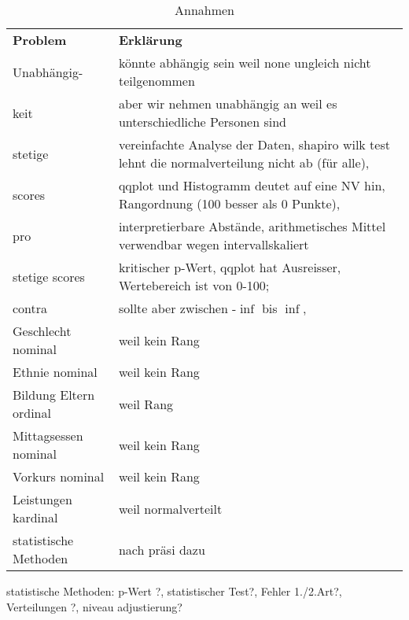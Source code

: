 \documentclass[11pt,a4paper]{article}
\author{Tim Ritter}
\begin{document}
\begin{table}[h!]
\caption{Annahmen}\bigskip
\centering
\begin{tabular}{l|l}
\textbf{Problem} & \textbf{Erklärung} \\
Unabhängig- & könnte abhängig sein weil none ungleich nicht teilgenommen \\
keit  & aber wir nehmen unabhängig an weil es unterschiedliche Personen sind\\
stetige &  vereinfachte Analyse der Daten, shapiro wilk test lehnt die normalverteilung nicht ab (für alle),\\
scores & qqplot und Histogramm deutet auf eine NV hin, Rangordnung (100 besser als 0 Punkte), \\
pro & interpretierbare Abstände, arithmetisches Mittel verwendbar wegen intervallskaliert   \\
stetige scores & kritischer p-Wert, qqplot hat Ausreisser, Wertebereich ist von 0-100; \\
 contra & sollte aber zwischen -$\inf$ bis $\inf$,  \\
Geschlecht nominal & weil kein Rang \\
Ethnie nominal & weil kein Rang \\
Bildung Eltern ordinal & weil Rang \\
Mittagsessen nominal & weil kein Rang \\
Vorkurs nominal & weil kein Rang \\
Leistungen kardinal & weil normalverteilt \\
statistische Methoden & nach präsi dazu


\end{tabular}
\end{table}

statistische Methoden: p-Wert ?, statistischer Test?, Fehler 1./2.Art?, Verteilungen ?, niveau adjustierung?
\end{document}

